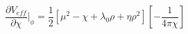 \begin{equation}
\frac{\partial V_{eff}} {\partial \chi}|_{\phi}= \frac{1}{2} [\mu^2 -
\chi+\lambda_0 \rho + \eta \rho^2][- \frac{1} {4 \pi
\chi}]
\end{equation}

